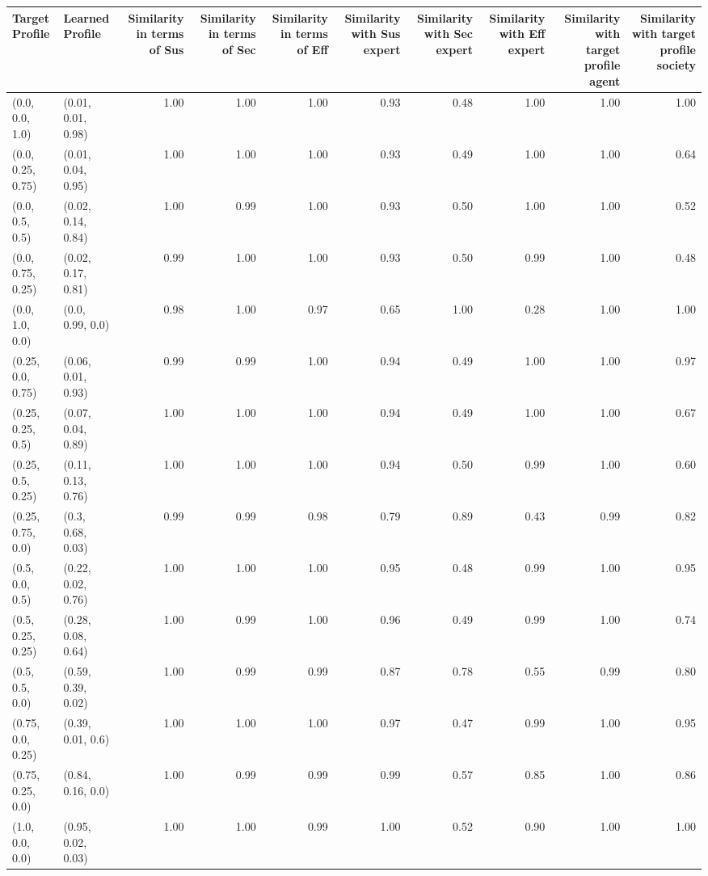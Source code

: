 \begin{tabular}{llrrrrrrrr}
\toprule
Target Profile & Learned Profile & Similarity in terms of Sus & Similarity in terms of Sec & Similarity in terms of Eff & Similarity with Sus expert & Similarity with Sec expert & Similarity with Eff expert & Similarity with target profile agent & Similarity with target profile society \\
\midrule
(0.0, 0.0, 1.0) & (0.01, 0.01, 0.98) & 1.00 & 1.00 & 1.00 & 0.93 & 0.48 & 1.00 & 1.00 & 1.00 \\
(0.0, 0.25, 0.75) & (0.01, 0.04, 0.95) & 1.00 & 1.00 & 1.00 & 0.93 & 0.49 & 1.00 & 1.00 & 0.64 \\
(0.0, 0.5, 0.5) & (0.02, 0.14, 0.84) & 1.00 & 0.99 & 1.00 & 0.93 & 0.50 & 1.00 & 1.00 & 0.52 \\
(0.0, 0.75, 0.25) & (0.02, 0.17, 0.81) & 0.99 & 1.00 & 1.00 & 0.93 & 0.50 & 0.99 & 1.00 & 0.48 \\
(0.0, 1.0, 0.0) & (0.0, 0.99, 0.0) & 0.98 & 1.00 & 0.97 & 0.65 & 1.00 & 0.28 & 1.00 & 1.00 \\
(0.25, 0.0, 0.75) & (0.06, 0.01, 0.93) & 0.99 & 0.99 & 1.00 & 0.94 & 0.49 & 1.00 & 1.00 & 0.97 \\
(0.25, 0.25, 0.5) & (0.07, 0.04, 0.89) & 1.00 & 1.00 & 1.00 & 0.94 & 0.49 & 1.00 & 1.00 & 0.67 \\
(0.25, 0.5, 0.25) & (0.11, 0.13, 0.76) & 1.00 & 1.00 & 1.00 & 0.94 & 0.50 & 0.99 & 1.00 & 0.60 \\
(0.25, 0.75, 0.0) & (0.3, 0.68, 0.03) & 0.99 & 0.99 & 0.98 & 0.79 & 0.89 & 0.43 & 0.99 & 0.82 \\
(0.5, 0.0, 0.5) & (0.22, 0.02, 0.76) & 1.00 & 1.00 & 1.00 & 0.95 & 0.48 & 0.99 & 1.00 & 0.95 \\
(0.5, 0.25, 0.25) & (0.28, 0.08, 0.64) & 1.00 & 0.99 & 1.00 & 0.96 & 0.49 & 0.99 & 1.00 & 0.74 \\
(0.5, 0.5, 0.0) & (0.59, 0.39, 0.02) & 1.00 & 0.99 & 0.99 & 0.87 & 0.78 & 0.55 & 0.99 & 0.80 \\
(0.75, 0.0, 0.25) & (0.39, 0.01, 0.6) & 1.00 & 1.00 & 1.00 & 0.97 & 0.47 & 0.99 & 1.00 & 0.95 \\
(0.75, 0.25, 0.0) & (0.84, 0.16, 0.0) & 1.00 & 0.99 & 0.99 & 0.99 & 0.57 & 0.85 & 1.00 & 0.86 \\
(1.0, 0.0, 0.0) & (0.95, 0.02, 0.03) & 1.00 & 1.00 & 0.99 & 1.00 & 0.52 & 0.90 & 1.00 & 1.00 \\
\bottomrule
\end{tabular}

